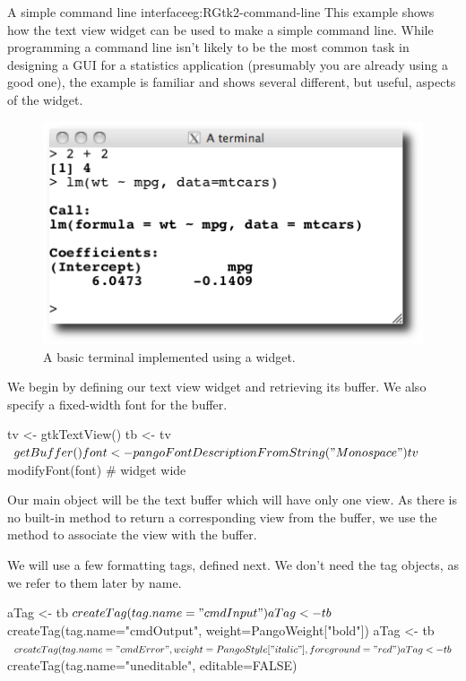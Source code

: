 \begin{example}{A simple command line interface}{eg:RGtk2-command-line}
This example shows how the text view widget can be used to make a
simple command line. While programming a command line isn't likely to
be the most common task in designing a GUI for a statistics
application (presumably you are already using a good one), the example
is familiar and shows several different, but useful, aspects
of the widget.

\begin{figure}
  \centering
  \includegraphics[width=.6\textwidth]{ex-RGtk2-terminal}
  \caption{A basic \R\/ terminal implemented using a  widget.}
  \label{fig:RGtk2-terminal}
\end{figure}


We begin by defining our text view widget and retrieving its
buffer. We also specify a fixed-width font for the buffer.
\begin{Schunk}
\begin{Sinput}
 tv <- gtkTextView()
 tb <- tv$getBuffer()
 font <- pangoFontDescriptionFromString("Monospace")
 tv$modifyFont(font)                     # widget wide
\end{Sinput}
\end{Schunk}

Our main object will be the text buffer which will have only one
view. As there is no built-in method to return a corresponding view
from the buffer, we use the  method to
associate the view with the buffer.
\begin{Schunk}
\end{Schunk}

We will use a few formatting tags, defined next. We don't need the tag
objects, as we refer to them later by name.
\begin{Schunk}
\begin{Sinput}
 aTag <- tb$createTag(tag.name="cmdInput")
 aTag <- tb$createTag(tag.name="cmdOutput", 
                      weight=PangoWeight["bold"])
 aTag <- tb$createTag(tag.name="cmdError", 
                      weight=PangoStyle["italic"], foreground="red")
 aTag <- tb$createTag(tag.name="uneditable", editable=FALSE)
\end{Sinput}
\end{Schunk}


\end{example}

